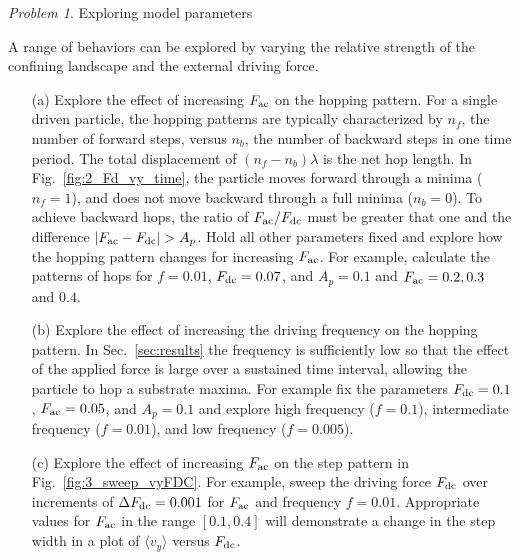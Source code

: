 \documentclass[preprint,showpacs,preprintnumbers,amsmath,amssymb,aps,prb]{revtex4-1}
\theoremstyle{remark}
\newtheorem{problem}{Problem}
\begin{document}
\begin{problem}{Exploring model parameters}
\label{ex:parameters}

\noindent A range of  behaviors
can be explored by varying the
  relative strength of the confining landscape
  and the external driving force.

\begin{enumerate}

\item[(a)]
  Explore the effect of increasing $F_{\rm ac}$ on the hopping pattern.
  For a single driven particle,
  the hopping patterns are typically characterized
  by $n_f$, the number of forward steps,
  versus $n_b$, the number of backward steps  in one
  time period.
  The total displacement of $(n_f - n_b) \lambda$ 
  is the net hop length.  
  In Fig.~\ref{fig:2_Fd_vy_time},
  the particle moves forward through a minima ($n_f = 1$),
  and does not move backward through a full minima ($n_b = 0$).  
  To achieve
  backward hops,
  the  ratio of $F_{\rm ac}/F_{\rm dc}$ must be greater that one  
  and the difference $|F_{\rm ac} - F_{\rm dc}| > A_p$.
  Hold all other parameters fixed and %
  explore how the hopping pattern
  changes for increasing $F_{\rm ac}$.
  For example,
  calculate the patterns of hops for  
  $f=0.01$, $F_{\rm dc}=0.07$, and $A_p = 0.1$
  and
  $F_{\rm ac} = 0.2, 0.3$ and $0.4$.
  
\item[(b)] Explore the effect of increasing the driving frequency on the hopping pattern. In Sec.~\ref{sec:results}
  the frequency is sufficiently low so that the effect of 
  the applied force is large
  over a sustained time interval,
  allowing the particle to hop a substrate maxima.
  For example fix
  the parameters
  $F_{\rm dc}=0.1$, $F_{\rm ac}=0.05$, and $A_p = 0.1$
  and explore
  high frequency 
  ($f = 0.1$),
  intermediate frequency 
  ($f = 0.01$),
  and low frequency
  ($f = 0.005$).
 
\item[(c)] Explore the effect of increasing  $F_{\rm ac}$ on the step pattern in Fig.~\ref{fig:3_sweep_vyFDC}.
  For example, sweep the driving force $F_{\rm dc}$
  over increments of $\Delta F_{\rm dc} = 0.001$
  for    $F_{\rm ac}$ and frequency $f=0.01$.
  Appropriate values for 
  $F_{\rm ac}$ in the range $[0.1, 0.4]$
  will demonstrate a change in the step width
  in a plot of $\langle v_y \rangle$ versus $F_{\rm dc}$.
  
  \end{enumerate}
  \end{problem}
  
\end{document}
